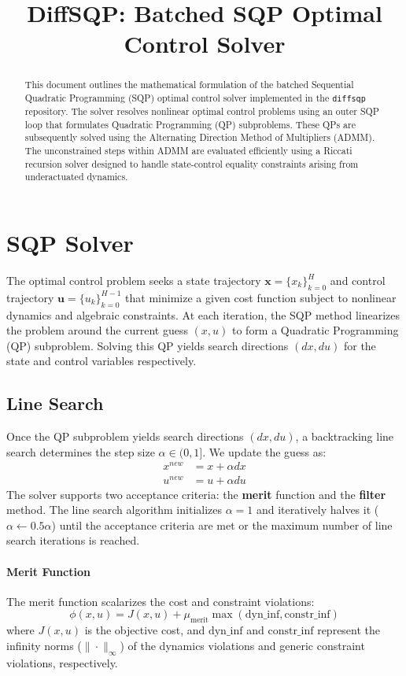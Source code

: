 \documentclass[11pt]{article}
\title{DiffSQP: Batched SQP Optimal Control Solver}
\author{}
\date{}
\begin{document}
\maketitle

\begin{abstract}
This document outlines the mathematical formulation of the batched Sequential Quadratic Programming (SQP) optimal control solver implemented in the \texttt{diffsqp} repository. The solver resolves nonlinear optimal control problems using an outer SQP loop that formulates Quadratic Programming (QP) subproblems. These QPs are subsequently solved using the Alternating Direction Method of Multipliers (ADMM). The unconstrained steps within ADMM are evaluated efficiently using a Riccati recursion solver designed to handle state-control equality constraints arising from underactuated dynamics.
\end{abstract}

\section{SQP Solver}

The optimal control problem seeks a state trajectory $\mathbf{x} = \{x_k\}_{k=0}^H$ and control trajectory $\mathbf{u} = \{u_k\}_{k=0}^{H-1}$ that minimize a given cost function subject to nonlinear dynamics and algebraic constraints. At each iteration, the SQP method linearizes the problem around the current guess $(x, u)$ to form a Quadratic Programming (QP) subproblem. Solving this QP yields search directions $(dx, du)$ for the state and control variables respectively.

\subsection{Line Search}
Once the QP subproblem yields search directions $(dx, du)$, a backtracking line search determines the step size $\alpha \in (0, 1]$. We update the guess as:
\begin{align*}
    x^{new} &= x + \alpha dx \\
    u^{new} &= u + \alpha du
\end{align*}
The solver supports two acceptance criteria: the \textbf{merit} function and the \textbf{filter} method. The line search algorithm initializes $\alpha = 1$ and iteratively halves it ($\alpha \gets 0.5 \alpha$) until the acceptance criteria are met or the maximum number of line search iterations is reached.

\paragraph{Merit Function}
The merit function scalarizes the cost and constraint violations:
\begin{equation}
    \phi(x, u) = J(x, u) + \mu_{\text{merit}} \max( \text{dyn\_inf}, \text{constr\_inf} )
\end{equation}
where $J(x, u)$ is the objective cost, and $\text{dyn\_inf}$ and $\text{constr\_inf}$ represent the infinity norms ($\| \cdot \|_\infty$) of the dynamics violations and generic constraint violations, respectively.
\end{document}
